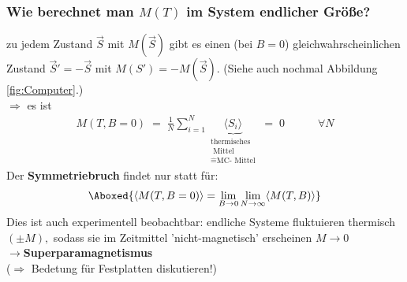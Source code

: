 \documentclass[12pt]{article}
\begin{document}
 \subsubsection*{Wie berechnet man $M(T)$ im System endlicher Größe?}
zu jedem Zustand $\vec{S}$ mit $M(\vec{S})$ gibt es einen (bei $ B=0$) gleichwahrscheinlichen Zustand $\vec{S}'= -\vec{S}$ mit $M(S') = - M(\vec{S})$. (Siehe auch nochmal Abbildung \ref{fig:Computer}.) \\
$\Rightarrow$ es ist 
\begin{align*}
M(T,B=0) \; = \;  \frac{1}{N} \sum_{i=1}^N \underbrace{\langle S_i \rangle}_{\substack{ \text{thermisches} \\ \text{ Mittel} \\ \widehat{=} \text{MC- Mittel}}} \; = \; 0 \quad \quad \quad \forall N
\end{align*} 
Der \textbf{Symmetriebruch} findet nur statt für: 
\begin{align}
\Aboxed{\langle M(T,B=0) \rangle = \lim_{B \to 0} \lim_{N \to \infty} \langle M(T,B) \rangle }
\end{align} 
Dies ist auch experimentell beobachtbar: endliche Systeme fluktuieren thermisch $(\pm M),$ sodass sie im Zeitmittel 'nicht-magnetisch' erscheinen $M \to 0$ \\
$\to$\textbf{Superparamagnetismus} \\ ($\Rightarrow$ Bedetung für Festplatten diskutieren!) \\
\end{document}
